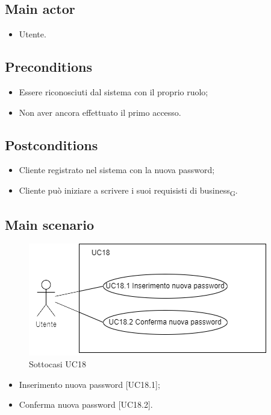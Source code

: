\documentclass{article}
\begin{document}
\subsection*{Main actor}
        \begin{itemize}
            \item Utente.
        \end{itemize}
        
    \subsection*{Preconditions}
        \begin{itemize}
            \item Essere riconosciuti dal sistema con il proprio ruolo;
            \item Non aver ancora effettuato il primo accesso.
        \end{itemize}
        
    \subsection*{Postconditions}
        \begin{itemize}
            \item Cliente registrato nel sistema con la nuova password;
            \item Cliente può iniziare a scrivere i suoi requisisti di business\textsubscript{G}.
        \end{itemize}
     \subsection*{Main scenario}
        \begin{figure}[h]
          \centering
          \includegraphics{./imgUML/UC18-zoom.png}
            \caption{Sottocasi UC18}
          \label{fig:UC18_sottocasi}
        \end{figure}
        
        \begin{itemize}
            \item Inserimento nuova password [UC18.1];
            \item Conferma nuova password [UC18.2].
        \end{itemize}
\end{document}
